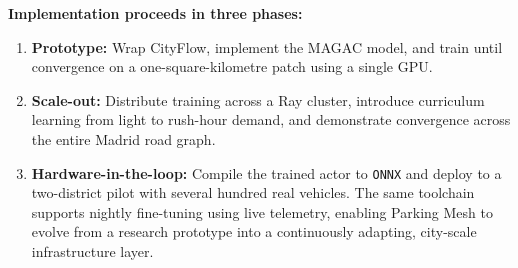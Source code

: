 \vspace{1em}

\noindent\textbf{Implementation proceeds in three phases:}

\begin{enumerate}
    \item \textbf{Prototype:} Wrap CityFlow, implement the MAGAC model, and train until convergence on a one-square-kilometre patch using a single GPU.
    
    \item \textbf{Scale-out:} Distribute training across a Ray cluster, introduce curriculum learning from light to rush-hour demand, and demonstrate convergence across the entire Madrid road graph.
    
    \item \textbf{Hardware-in-the-loop:} Compile the trained actor to \texttt{ONNX} and deploy to a two-district pilot with several hundred real vehicles. The same toolchain supports nightly fine-tuning using live telemetry, enabling Parking Mesh to evolve from a research prototype into a continuously adapting, city-scale infrastructure layer.
\end{enumerate}
